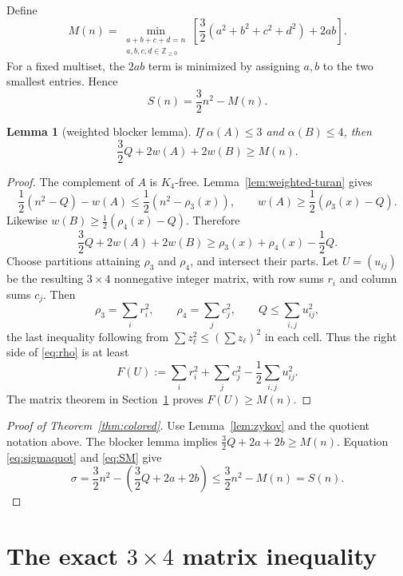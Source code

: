 \documentclass[11pt]{article}
\theoremstyle{plain}
\newtheorem{lemma}[theorem]{Lemma}
\theoremstyle{definition}
\theoremstyle{remark}
\newcommand{\1}{\mathbf 1}
\begin{document}
Define
\begin{equation}\label{eq:Mdef}
 M(n)=\min_{\substack{a+b+c+d=n\\a,b,c,d\in\mathbb Z_{\geq0}}}
 \left[\frac32(a^2+b^2+c^2+d^2)+2ab\right].
\end{equation}
For a fixed multiset, the $2ab$ term is minimized by assigning $a,b$ to the
two smallest entries.  Hence
\begin{equation}\label{eq:SM}
 S(n)=\frac32n^2-M(n).
\end{equation}

\begin{lemma}[weighted blocker lemma]\label{lem:blocker}
If $\alpha(A)\leq3$ and $\alpha(B)\leq4$, then
\begin{equation}\label{eq:blocker}
 \frac32Q+2w(A)+2w(B)\geq M(n).
\end{equation}
\end{lemma}

\begin{proof}
The complement of $A$ is $K_4$-free.  Lemma~\ref{lem:weighted-turan} gives
\[
 \frac12(n^2-Q)-w(A)\leq\frac12(n^2-\rho_3(x)),
 \qquad
 w(A)\geq\frac12(\rho_3(x)-Q).
\]
Likewise
$w(B)\geq\frac12(\rho_4(x)-Q)$.  Therefore
\begin{equation}\label{eq:rho}
 \frac32Q+2w(A)+2w(B)
 \geq\rho_3(x)+\rho_4(x)-\frac12Q.
\end{equation}
Choose partitions attaining $\rho_3$ and $\rho_4$, and intersect their parts.
Let $U=(u_{ij})$ be the resulting $3\times4$ nonnegative integer matrix, with
row sums $r_i$ and column sums $c_j$.  Then
\[
 \rho_3=\sum_i r_i^2,
 \qquad \rho_4=\sum_j c_j^2,
 \qquad Q\leq\sum_{i,j}u_{ij}^2,
\]
the last inequality following from $\sum z_\ell^2\leq(\sum z_\ell)^2$ in
each cell.  Thus the right side of \eqref{eq:rho} is at least
\[
 F(U):=\sum_i r_i^2+\sum_jc_j^2-\frac12\sum_{i,j}u_{ij}^2.
\]
The matrix theorem in Section~\ref{sec:matrix} proves $F(U)\geq M(n)$.
\end{proof}

\begin{proof}[Proof of Theorem~\ref{thm:colored}]
Use Lemma~\ref{lem:zykov} and the quotient notation above.  The blocker lemma
implies
$\frac32Q+2a+2b\geq M(n)$.  Equation \eqref{eq:sigmaquot} and
\eqref{eq:SM} give
\[
 \sigma=\frac32n^2-\left(\frac32Q+2a+2b\right)
 \leq\frac32n^2-M(n)=S(n).
\]
\end{proof}

\section{The exact $3\times4$ matrix inequality}\label{sec:matrix}
\end{document}
